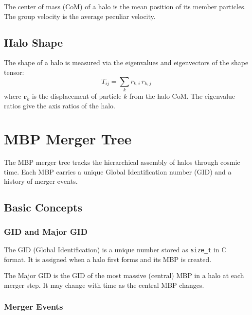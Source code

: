 \documentclass[11pt,fleqn]{book}
\newcommand{\code}[1]{\texttt{#1}}
\begin{document}
The center of mass (CoM) of a halo is the mean position of its member particles.  The group velocity is the average peculiar velocity.

\section{Halo Shape}

The shape of a halo is measured via the eigenvalues and eigenvectors of the shape tensor:
\begin{equation}
  T_{ij} = \sum_k r_{k,i}\,r_{k,j}
\end{equation}
where $\mathbf{r}_k$ is the displacement of particle $k$ from the halo CoM.  The eigenvalue ratios give the axis ratios of the halo.


\chapter{MBP Merger Tree}
\label{ch:mergertree}

The MBP merger tree tracks the hierarchical assembly of halos through cosmic time.  Each MBP carries a unique Global Identification number (GID) and a history of merger events.

\section{Basic Concepts}

\subsection{GID and Major GID}

\begin{definition}[GID]
The GID (Global Identification) is a unique number stored as \code{size\_t} in C format.  It is assigned when a halo first forms and its MBP is created.
\end{definition}

\begin{definition}
The Major GID is the GID of the most massive (central) MBP in a halo at each merger step.  It may change with time as the central MBP changes.
\end{definition}

\subsection{Merger Events}
\end{document}

